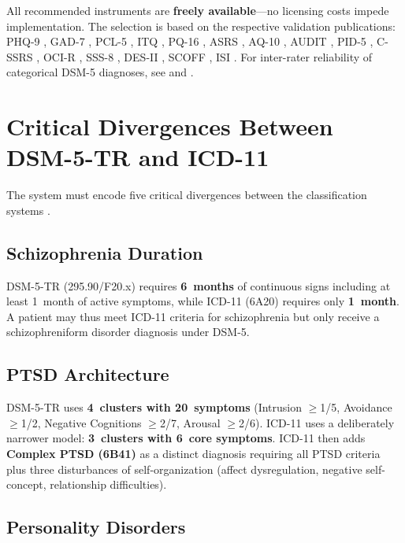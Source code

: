 \documentclass[11pt,a4paper]{article}
\begin{document}
All recommended instruments are \textbf{freely available}---no licensing costs impede implementation. The selection is based on the respective validation publications: PHQ-9 \citep{Levis2019}, GAD-7 \citep{Spitzer2006}, PCL-5 \citep{Blevins2015}, ITQ \citep{Cloitre2018}, PQ-16 \citep{Ising2012}, ASRS \citep{Kessler2005}, AQ-10 \citep{Allison2012}, AUDIT \citep{Saunders1993}, PID-5 \citep{OltmannsWidiger2018, Zimmermann2021}, C-SSRS \citep{Posner2011}, OCI-R \citep{Foa2002}, SSS-8 \citep{Gierk2014}, DES-II \citep{CarlsonPutnam1993}, SCOFF \citep{Morgan1999}, ISI \citep{Morin2011}. For inter-rater reliability of categorical DSM-5 diagnoses, see \citet{Regier2013} and \citet{Aboraya2006}.

\section{Critical Divergences Between DSM-5-TR and ICD-11}
\label{sec:divergences}

The system must encode five critical divergences between the classification systems \citep{Keeley2016}.

\subsection{Schizophrenia Duration}

DSM-5-TR (295.90/F20.x) requires \textbf{6~months} of continuous signs including at least 1~month of active symptoms, while ICD-11 (6A20) requires only \textbf{1~month}. A patient may thus meet ICD-11 criteria for schizophrenia but only receive a schizophreniform disorder diagnosis under DSM-5.

\subsection{PTSD Architecture}

DSM-5-TR uses \textbf{4~clusters with 20~symptoms} (Intrusion $\geq$1/5, Avoidance $\geq$1/2, Negative Cognitions $\geq$2/7, Arousal $\geq$2/6). ICD-11 uses a deliberately narrower model: \textbf{3~clusters with 6~core symptoms}. ICD-11 then adds \textbf{Complex PTSD (6B41)} as a distinct diagnosis requiring all PTSD criteria plus three disturbances of self-organization (affect dysregulation, negative self-concept, relationship difficulties).

\subsection{Personality Disorders}
\end{document}
